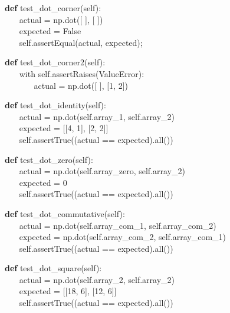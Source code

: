 \begin{algorithm}[H]
	\textbf{def} test\_dot\_corner(self):
	\\ $ ~~~~~~~~ $actual = np.dot([ ], [ ])
	\\ $ ~~~~~~~~ $expected = False
	\\ $ ~~~~~~~~ $self.assertEqual(actual, expected);
\end{algorithm}

\begin{algorithm}[H]
	\textbf{def} test\_dot\_corner2(self):
	\\ $ ~~~~~~~~ $with self.assertRaises(ValueError):
	\\ $ ~~~~~~~~~~~~~~~~ $actual = np.dot([ ], [1, 2])
\end{algorithm}

\begin{algorithm}[H]
	\textbf{def} test\_dot\_identity(self):
	\\ $ ~~~~~~~~ $actual = np.dot(self.array\_1, self.array\_2)
	\\ $ ~~~~~~~~ $expected = [[4, 1], [2, 2]]
	\\ $ ~~~~~~~~ $self.assertTrue((actual == expected).all())
\end{algorithm}

\begin{algorithm}[H]
	\textbf{def} test\_dot\_zero(self):
	\\ $ ~~~~~~~~ $actual = np.dot(self.array\_zero, self.array\_2)
	\\ $ ~~~~~~~~ $expected = 0
	\\ $ ~~~~~~~~ $self.assertTrue((actual == expected).all())
\end{algorithm}

\begin{algorithm}[H]
    \textbf{def} test\_dot\_commutative(self):
\\ $ ~~~~~~~~ $actual = np.dot(self.array\_com\_1, self.array\_com\_2)
\\ $ ~~~~~~~~ $expected = np.dot(self.array\_com\_2, self.array\_com\_1)
\\ $ ~~~~~~~~ $self.assertTrue((actual == expected).all())
\end{algorithm}

\begin{algorithm}[H]
    \textbf{def} test\_dot\_square(self):
\\ $ ~~~~~~~~ $actual = np.dot(self.array\_2, self.array\_2)
\\ $ ~~~~~~~~ $expected = [[18, 6], [12, 6]]
\\ $ ~~~~~~~~ $self.assertTrue((actual == expected).all())
\end{algorithm}

